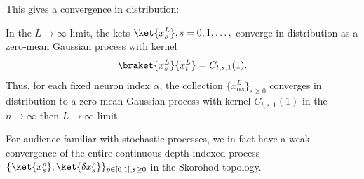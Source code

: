 This gives a convergence in distribution:

\begin{theorem}
    In the $L \to \infty$ limit, the kets $\ket{x^L_s}, s = 0, 1, \ldots,$ converge in distribution as a zero-mean Gaussian process with kernel
    \[\braket{x^L_s}{x^L_t} = C_{t,s,1}(1).\]
    Thus, for each fixed neuron index $\alpha$, the collection $\{x^L_{\alpha s}\}_{s\ge 0}$ converges in distribution to a zero-mean Gaussian process with kernel $C_{t,s,1}(1)$ in the $n\to\infty$ then $L\to\infty$ limit.
\end{theorem}

For audience familiar with stochastic processes, we in fact have a weak convergence of the entire continuous-depth-indexed process $\{\ket{x^{p}_s}, \ket{\delta x^{p}_s}\}_{p \in [0, 1],s\ge0}$ in the Skorohod topology.

 

    


